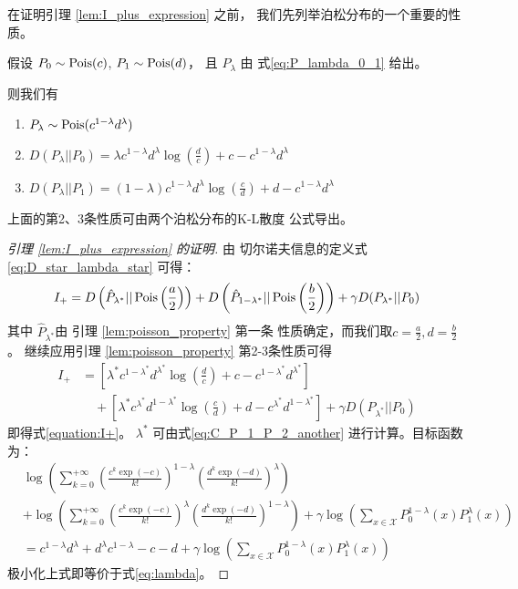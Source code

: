 在证明引理
 \ref{lem:I_plus_expression}   之前，
我们先列举泊松分布的一个重要的性质。
\begin{lemma}\label{lem:poisson_property}
假设 $P_0 \sim \operatorname{Pois}(c)$, $P_1 \sim \operatorname{Pois}(d)$，
且 $P_{\lambda}$ 由 式\eqref{eq:P_lambda_0_1}
给出。

则我们有
\begin{enumerate}
    \item $P_{\lambda} \sim \operatorname{Pois}(c^{1-\lambda} d^{\lambda})$
    \item $D(P_{\lambda}||P_0) = 
    \lambda c^{1-\lambda}d^{\lambda}\log(\frac{d}{c}) + c-c^{1-\lambda}d^{\lambda}$
    \item $D(P_{\lambda}||P_1) = (1-\lambda)
    c^{1-\lambda}d^{\lambda}\log(\frac{c}{d})
    + d-c^{1-\lambda}d^{\lambda}$
\end{enumerate}
\end{lemma}
上面的第2、3条性质可由两个泊松分布的K-L散度
公式导出。
\begin{proof}[引理 \ref{lem:I_plus_expression} 的证明]
由 切尔诺夫信息的定义式 \eqref{eq:D_star_lambda_star} 
可得：
$$
I_+ = D\left(\hat{P}_{\lambda^*} || \operatorname{Pois}\left(\frac{a}{2}\right) \right)
+ D\left(\hat{P}_{1-\lambda^*} || \operatorname{Pois}\left(\frac{b}{2}\right) \right)
+ \gamma D(P_{\lambda^*} || P_0)
$$
其中 $\hat{P}_{\lambda^*}$由
引理 \ref{lem:poisson_property} 第一条
性质确定，而我们取$c=\frac{a}{2}, d=\frac{b}{2}$。
继续应用引理 \ref{lem:poisson_property} 第2-3条性质可得
\begin{align*}
    I_+ &= \left[\lambda^* c^{1-\lambda^*}d^{\lambda^*}
    \log(\frac{d}{c})+ c-c^{1-\lambda^*}d^{\lambda^*}
    \right] \\
&\quad + \left[\lambda^* c^{\lambda^*}d^{1-\lambda^*}\log(\frac{c}{d})
+ d - c^{\lambda^*}d^{1-\lambda^*}\right]
+ \gamma D(P_{\lambda^*} || P_0)
\end{align*}
即得式\eqref{equation:I+}。
$\lambda^*$ 可由式\eqref{eq:C_P_1_P_2_another} 
进行计算。目标函数为：
\begin{align*}
&\log\left(\sum_{k=0}^{+\infty} \left(\frac{c^k\exp(-c)}{k!}
\right)^{1-\lambda}
\left(\frac{d^k\exp(-d)}{k!} \right)^{\lambda}
\right) \\
& + \log\left(\sum_{k=0}^{+\infty} \left(\frac{c^k\exp(-c)}{k!}
\right)^{\lambda}
\left(\frac{d^k\exp(-d)}{k!} \right)^{1-\lambda}
\right)+
\gamma\log \left(\sum_{x\in \mathcal{X}}P^{1-\lambda}_0(x) P^{\lambda}_1(x)
\right)\\
& = c^{1-\lambda} d^{\lambda} 
+ d^{\lambda} c^{1-\lambda} -c -d +
\gamma\log \left(\sum_{x\in \mathcal{X}}P^{1-\lambda}_0(x) P^{\lambda}_1(x)
\right)
\end{align*}
极小化上式即等价于式\eqref{eq:lambda}。
\end{proof}

